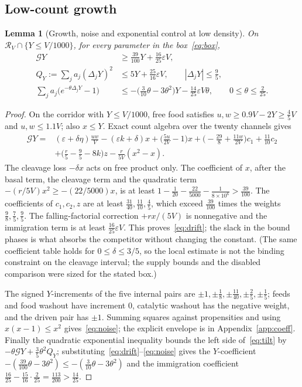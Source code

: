 \documentclass[11pt,a4paper]{article}
\theoremstyle{plain}
\newtheorem{lemma}[theorem]{Lemma}
\theoremstyle{definition}
\theoremstyle{remark}
\newcommand{\G}{\mathcal G}
\newcommand{\R}{\mathcal R_V}
\newcommand{\eps}{\varepsilon}
\begin{document}
\subsection{Low-count growth}
\begin{lemma}[Growth, noise and exponential control at low density]\label{lem:local}
On $\R\cap\{Y\le V/1000\}$, for every parameter in the box~\eqref{eq:box},
\begin{align}
 \G Y&\ge\frac{39}{100}Y+\frac{16}{25}\eps V,\label{eq:drift}\\
 Q_Y:=\sum_ja_j(\Delta_jY)^2&\le5Y+\frac{25}{16}\eps V,\qquad|\Delta_jY|\le\frac95,\label{eq:noise}\\
 \sum_ja_j\big(e^{-\theta\Delta_jY}-1\big)&\le-\Big(\frac3{10}\theta-3\theta^2\Big)Y-\frac{14}{25}\eps V\theta,\qquad0\le\theta\le\frac2{25}.\label{eq:tilt}
\end{align}
\end{lemma}
\begin{proof}
On the corridor with $Y\le V/1000$, free food satisfies $u,w\ge0.9V-2Y\ge\frac45V$ and $u,w\le1.1V$; also $x\le Y$. Exact count algebra over the twenty channels gives
\begin{equation}\label{eq:driftexpansion}
\begin{aligned}
 \G Y={}&(\eps+\delta\eta)\frac{uw}V-(\eps k+\delta)x+\Big(\frac{5u}{2V}-1\Big)x
 +\Big(-\frac{29}8+\frac{11w}{2V}\Big)c_1+\frac{11}{10}c_2\\
 &+\Big(\frac r5-\frac95-8k\Big)z-\frac r{5V}(x^2-x).
\end{aligned}
\end{equation}
The cleavage loss $-\delta x$ acts on free product only. The coefficient of $x$, after the basal term, the cleavage term and the quadratic term $-(r/5V)x^2\ge-(22/5000)x$, is at least $1-\frac1{20}-\frac{22}{5000}-\frac1{8\times10^6}>\frac{39}{100}$. The coefficients of $c_1,c_2,z$ are at least $\frac{31}{40},\frac{11}{10},\frac45$, which exceed $\frac{39}{100}$ times the weights $\frac98,\frac75,\frac95$. The falling-factorial correction $+rx/(5V)$ is nonnegative and the immigration term is at least $\frac{16}{25}\eps V$. This proves~\eqref{eq:drift}; the slack in the bound phases is what absorbs the competitor without changing the constant. (The same coefficient table holds for $0\le\delta\le3/5$, so the local estimate is not the binding constraint on the cleavage interval; the supply bounds and the disabled comparison were sized for the stated box.)

The signed $Y$-increments of the five internal pairs are $\pm1,\pm\frac18,\pm\frac{11}{40},\pm\frac25,\pm\frac15$; feeds and food washout have increment $0$, catalytic washout has the negative weight, and the driven pair has $\pm1$. Summing squares against propensities and using $x(x-1)\le x^2$ gives~\eqref{eq:noise}; the explicit envelope is in Appendix~\ref{app:coeff}. Finally the quadratic exponential inequality bounds the left side of~\eqref{eq:tilt} by $-\theta\G Y+\frac35\theta^2Q_Y$; substituting~\eqref{eq:drift}--\eqref{eq:noise} gives the $Y$-coefficient $-(\frac{39}{100}\theta-3\theta^2)\le-(\frac3{10}\theta-3\theta^2)$ and the immigration coefficient $\frac{16}{25}-\frac{15}{16}\cdot\frac2{25}=\frac{113}{200}>\frac{14}{25}$.
\end{proof}
\end{document}
